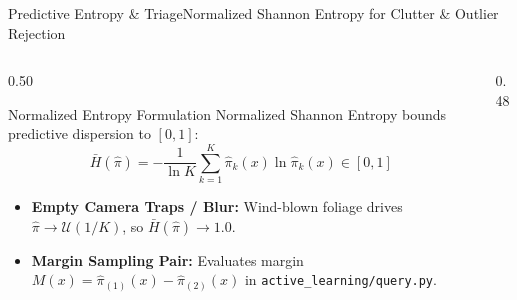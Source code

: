 \begin{frame}{Predictive Entropy \& Triage}{Normalized Shannon Entropy for Clutter \& Outlier Rejection}
    \vspace{-0.25cm}
    \begin{columns}[T]
        \begin{column}{0.50\textwidth}
            \begin{block}{Normalized Entropy Formulation}\scriptsize
                Normalized Shannon Entropy bounds predictive dispersion to $[0, 1]$:
                \[
                    \bar{H}(\hat{\pi}) = -\frac{1}{\ln K} \sum_{k=1}^K \hat{\pi}_k(x) \ln \hat{\pi}_k(x) \in [0, 1]
                \]
                \begin{itemize}\setlength{\itemsep}{1pt}
                    \item \textbf{Empty Camera Traps / Blur:} Wind-blown foliage drives $\hat{\pi} \to \mathcal{U}(1/K)$, so $\bar{H}(\hat{\pi}) \to 1.0$.
                    \item \textbf{Margin Sampling Pair:} Evaluates margin $M(x) = \hat{\pi}_{(1)}(x) - \hat{\pi}_{(2)}(x)$ in \texttt{active\_learning/query.py}.
                \end{itemize}
            \end{block}
        \end{column}
        \begin{column}{0.48\textwidth}
            \begin{center}
\end{center}
\end{column}
\end{columns}
\end{frame}
